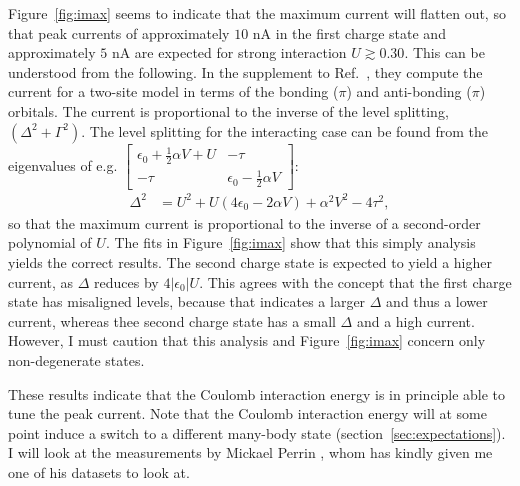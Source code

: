 Figure~\ref{fig:imax} seems to indicate that the maximum current will flatten out, so that peak currents of approximately $10$ nA in the first charge state and approximately $5$ nA are expected for strong interaction $U \gtrsim 0.30$. This can be understood from the following. In the supplement to Ref.~\cite{perrinnano}, they compute the current for a two-site model in terms of the bonding ($\pi$) and anti-bonding ($\pi$) orbitals. The current is proportional to the inverse of the level splitting, $\left( \Delta^2 + \Gamma^2 \right)$. The level splitting for the interacting case can be found from the eigenvalues of e.g. $\begin{bmatrix} \epsilon_0 + \frac{1}{2} \alpha V+U & -\tau \\
-\tau & \epsilon_0 - \frac{1}{2} \alpha V\end{bmatrix}$:
\begin{align*}
\Delta^2 &= U^2 + U \left(4\epsilon_0 - 2 \alpha V\right) + \alpha^2 V^2 - 4 \tau^2,
\end{align*}
so that the maximum current is proportional to the inverse of a second-order polynomial of $U$. The fits in Figure~\ref{fig:imax} show that this simply analysis yields the correct results. The second charge state is expected to yield a higher current, as $\Delta$ reduces by $4 \left|\epsilon_0 \right| U$. This agrees with the concept that the first charge state has misaligned levels, because that indicates a larger $\Delta$ and thus a lower current, whereas thee second charge state has a small $\Delta$ and a high current. However, I must caution that this analysis and Figure~\ref{fig:imax} concern only non-degenerate states.

These results indicate that the Coulomb interaction energy is in principle able to tune the peak current. Note that the Coulomb interaction energy will at some point induce a switch to a different many-body state (section~\ref{sec:expectations}). I will look at the measurements by Mickael Perrin \cite{perrin, perrinnano}, whom has kindly given me one of his datasets to look at. 

